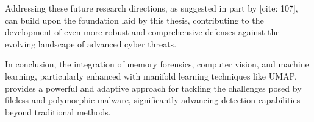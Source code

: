 Addressing these future research directions, as suggested in part by \citet{kushwaha2024adaptive}[cite: 107], can build upon the foundation laid by this thesis, contributing to the development of even more robust and comprehensive defenses against the evolving landscape of advanced cyber threats.

\bigskip %
\noindent In conclusion, the integration of memory forensics, computer vision, and machine learning, particularly enhanced with manifold learning techniques like UMAP, provides a powerful and adaptive approach for tackling the challenges posed by fileless and polymorphic malware, significantly advancing detection capabilities beyond traditional methods.

